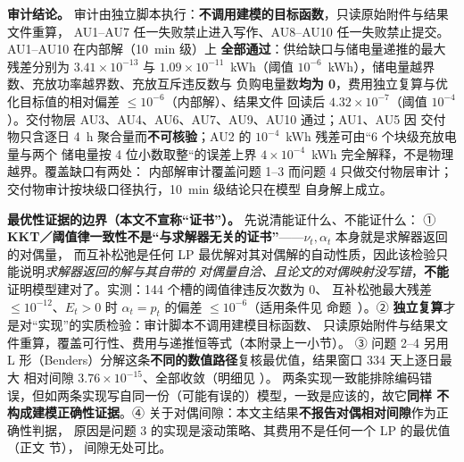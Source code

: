 \textbf{审计结论。} 审计由独立脚本执行：\textbf{不调用建模的目标函数}，只读原始附件与结果文件重算，
AU1--AU7 任一失败禁止进入写作、AU8--AU10 任一失败禁止提交。AU1--AU10 在内部解（10~min 级）上
\textbf{全部通过}：供给缺口与储电量递推的最大残差分别为 \(3.41\times10^{-13}\) 与
\(1.09\times10^{-11}\)~kWh（阈值 \(10^{-6}\)~kWh），储电量越界数、充放功率越界数、充放互斥违反数与
负购电量数\textbf{均为 0}，费用独立复算与优化目标值的相对偏差 \(\le10^{-6}\)（内部解）、结果文件
回读后 \(4.32\times10^{-7}\)（阈值 \(10^{-4}\)）。交付物层 AU3、AU4、AU6、AU7、AU9、AU10 通过；AU1、AU5 因
交付物只含逐日 4~h 聚合量而\textbf{不可核验}；AU2 的 \(10^{-4}\)~kWh 残差可由“6 个块级充放电量与两个
储电量按 4 位小数取整“的误差上界 \(4\times10^{-4}\)~kWh 完全解释，不是物理越界。覆盖缺口有两处：
内部解审计覆盖问题 1--3 而问题 4 只做交付物层审计；交付物审计按块级口径执行，10~min 级结论只在模型
自身解上成立。

\textbf{最优性证据的边界（本文不宣称“证书”）。} 先说清能证什么、不能证什么：
① \textbf{KKT／阈值律一致性不是“与求解器无关的证书”}——\(\nu_t,\alpha_t\) 本身就是求解器返回的对偶量，
而互补松弛是任何 LP 最优解对其对偶解的自动性质，因此该检验只能说明\emph{求解器返回的解与其自带的
对偶量自洽、且论文的对偶映射没写错}，\textbf{不能}证明模型建对了。实测：144 个槽的阈值律违反次数为 0、
互补松弛最大残差 \(\le10^{-12}\)、\(E_t>0\) 时 \(\alpha_t=p_t\) 的偏差 \(\le10^{-6}\)（适用条件见
命题~）。② \textbf{独立复算}才是对“实现”的实质检验：审计脚本不调用建模目标函数、
只读原始附件与结果文件重算，覆盖可行性、费用与递推恒等式（本附录上一小节）。
③ 问题 2--4 另用 L 形（Benders）分解这条\textbf{不同的数值路径}复核最优值，结果窗口 334 天上逐日最大
相对间隙 \(3.76\times10^{-15}\)、全部收敛（明细见 ）。
两条实现一致能排除编码错误，但如两条实现写自同一份（可能有误的）模型，一致是应该的，故它\textbf{同样
不构成建模正确性证据}。④ 关于对偶间隙：本文主结果\textbf{不报告对偶相对间隙}作为正确性判据，
原因是问题 3 的实现是滚动策略、其费用不是任何一个 LP 的最优值（正文  节），
间隙无处可比。

